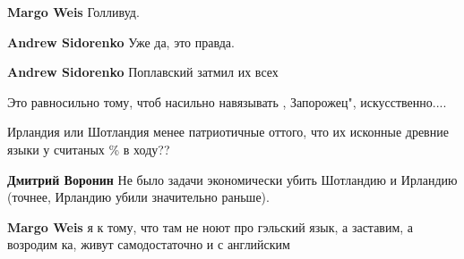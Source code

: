 \begin{itemize}
\begin{itemize}
\textbf{Margo Weis} Голливуд.

 
\textbf{Andrew Sidorenko} Уже да, это правда.

 
\textbf{Andrew Sidorenko} Поплавский затмил их всех

\end{itemize}

 

Это равносильно тому, чтоб насильно навязывать , Запорожец", искусственно....

Ирландия или Шотландия менее патриотичные оттого, что их исконные древние языки
у считаных \% в ходу??

\begin{itemize}
 
\textbf{Дмитрий Воронин} Не было задачи экономически убить Шотландию и Ирландию (точнее, Ирландию убили значительно раньше).

 
\textbf{Margo Weis} я к тому, что там не ноют про гэльский язык, а заставим, а возродим ка, живут самодостаточно и с английским

 

\end{itemize}
\end{itemize}
